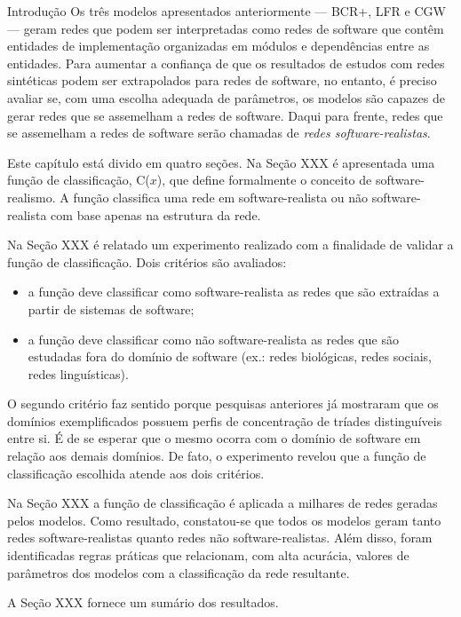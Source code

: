 \begin{section}{Introdução}
Os três modelos apresentados anteriormente --- BCR+, LFR e CGW --- geram redes que podem ser interpretadas como redes de software que contêm entidades de implementação organizadas em módulos e dependências entre as entidades. Para aumentar a confiança de que os resultados de estudos com redes sintéticas podem ser extrapolados para redes de software, no entanto, é preciso avaliar se, com uma escolha adequada de parâmetros, os modelos são capazes de gerar redes que se assemelham a redes de software. Daqui para frente, redes que se assemelham a redes de software serão chamadas de \emph{redes software-realistas}.

Este capítulo está divido em quatro seções. Na Seção XXX é apresentada uma função de classificação, C($x$), que define formalmente o conceito de software-realismo. A função classifica uma rede em software-realista ou não software-realista com base apenas na estrutura da rede.

Na Seção XXX é relatado um experimento realizado com a finalidade de validar a função de classificação. Dois critérios são avaliados:

\begin{itemize}
	\item a função deve classificar como software-realista as redes que são extraídas a partir de sistemas de software;
	\item a função deve classificar como não software-realista as redes que são estudadas fora do domínio de software (ex.: redes biológicas, redes sociais, redes linguísticas).
\end{itemize}

O segundo critério faz sentido porque pesquisas anteriores já mostraram que os domínios exemplificados possuem perfis de concentração de tríades distinguíveis entre si. É de se esperar que o mesmo ocorra com o domínio de software em relação aos demais domínios. De fato, o experimento revelou que a função de classificação escolhida atende aos dois critérios.

Na Seção XXX a função de classificação é aplicada a milhares de redes geradas pelos modelos. Como resultado, constatou-se que todos os modelos geram tanto redes software-realistas quanto redes não software-realistas. Além disso, foram identificadas regras práticas que relacionam, com alta acurácia, valores de parâmetros dos modelos com a classificação da rede resultante.

A Seção XXX fornece um sumário dos resultados.

\end{section}

